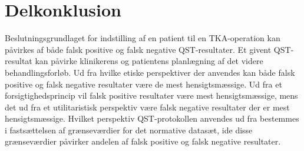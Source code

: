 \section{Delkonklusion}
Beslutningsgrundlaget for indstilling af en patient til en TKA-operation kan påvirkes af både falsk positive og falsk negative QST-resultater. Et givent QST-resultat kan påvirke klinikerens og patientens planlægning af det videre behandlingsforløb. Ud fra hvilke etiske perspektiver der anvendes kan både falsk positive og falsk negative resultater være de mest hensigtsmæssige. Ud fra et forsigtighedsprincip vil falsk positive resultater være mest hensigtsmæssige, mens det ud fra et utilitaristisk perspektiv være falsk negative resultater der er mest hensigtsmæssige. Hvilket perspektiv QST-protokollen anvendes ud fra bestemmes i fastsættelsen af grænseværdier for det normative datasæt, ide disse grænseværdier påvirker andelen af falsk positive og falsk negative resultater. 

